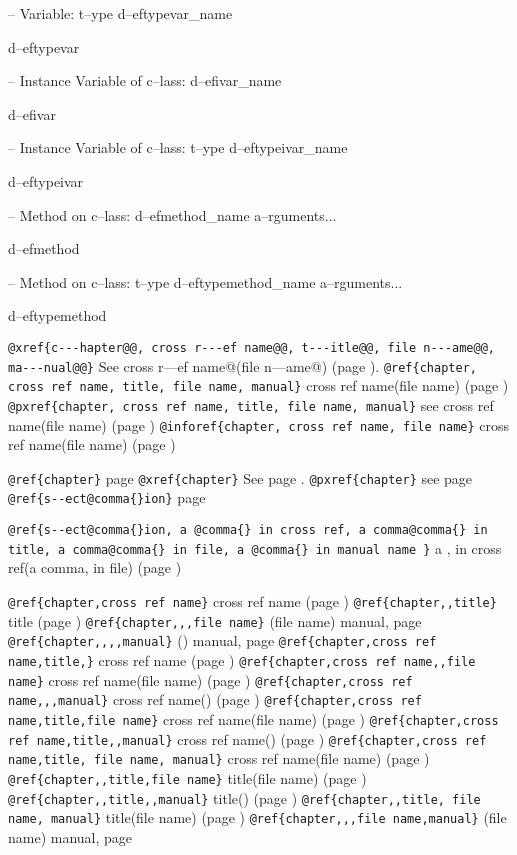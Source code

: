 \documentclass{book}
\begin{document}
\hbox{}-- Variable: t--ype d--eftypevar\_name


d--eftypevar

\hbox{}-- Instance Variable of c--lass: d--efivar\_name


d--efivar

\hbox{}-- Instance Variable of c--lass: t--ype d--eftypeivar\_name


d--eftypeivar

\hbox{}-- Method on c--lass: d--efmethod\_name a--rguments...


d--efmethod

\hbox{}-- Method on c--lass: t--ype d--eftypemethod\_name a--rguments...


d--eftypemethod

\texttt{@xref\{c{-}{-}{-}hapter@@, cross r{-}{-}{-}ef name@@, t{-}{-}{-}itle@@, file n{-}{-}{-}ame@@, ma{-}{-}{-}nual@@\}} See cross r---ef name@(file n---ame@) (page \pageref{anchor:c_002d_002d_002dhapter_0040}).
\texttt{@ref\{chapter, cross ref name, title, file name, manual\}} cross ref name(file name) (page \pageref{anchor:chapter})
\texttt{@pxref\{chapter, cross ref name, title, file name, manual\}} see cross ref name(file name) (page \pageref{anchor:chapter})
\texttt{@inforef\{chapter, cross ref name, file name\}} cross ref name(file name) (page \pageref{anchor:chapter})

\texttt{@ref\{chapter\}} page \pageref{anchor:chapter}
\texttt{@xref\{chapter\}} See page \pageref{anchor:chapter}.
\texttt{@pxref\{chapter\}} see page \pageref{anchor:chapter}
\texttt{@ref\{s{-}{-}ect@comma\{\}ion\}} page \pageref{anchor:s_002d_002dect_002cion}

\texttt{@ref\{s{-}{-}ect@comma\{\}ion, a @comma\{\} in cross
ref, a comma@comma\{\} in title, a comma@comma\{\} in file, a @comma\{\} in manual name \}}
a , in cross
ref(a comma, in file) (page \pageref{anchor:s_002d_002dect_002cion})

\texttt{@ref\{chapter,cross ref name\}} cross ref name (page \pageref{anchor:chapter})
\texttt{@ref\{chapter,,title\}} title (page \pageref{anchor:chapter})
\texttt{@ref\{chapter,,,file name\}} (file name) manual, page \pageref{anchor:chapter}
\texttt{@ref\{chapter,,,,manual\}} () manual, page \pageref{anchor:chapter}
\texttt{@ref\{chapter,cross ref name,title,\}} cross ref name (page \pageref{anchor:chapter})
\texttt{@ref\{chapter,cross ref name,,file name\}} cross ref name(file name) (page \pageref{anchor:chapter})
\texttt{@ref\{chapter,cross ref name,,,manual\}} cross ref name() (page \pageref{anchor:chapter})
\texttt{@ref\{chapter,cross ref name,title,file name\}} cross ref name(file name) (page \pageref{anchor:chapter})
\texttt{@ref\{chapter,cross ref name,title,,manual\}} cross ref name() (page \pageref{anchor:chapter})
\texttt{@ref\{chapter,cross ref name,title, file name, manual\}} cross ref name(file name) (page \pageref{anchor:chapter})
\texttt{@ref\{chapter,,title,file name\}} title(file name) (page \pageref{anchor:chapter})
\texttt{@ref\{chapter,,title,,manual\}} title() (page \pageref{anchor:chapter})
\texttt{@ref\{chapter,,title, file name, manual\}} title(file name) (page \pageref{anchor:chapter})
\texttt{@ref\{chapter,,,file name,manual\}} (file name) manual, page \pageref{anchor:chapter}
\end{document}
